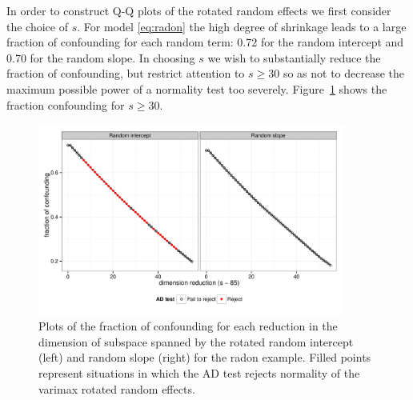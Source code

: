 \documentclass[12pt]{article} %
\newcommand{\hh}[1]{{\color{orange} #1}}
\begin{document}
In order to construct Q-Q plots of the rotated random effects we first consider the choice of $s$. For model \eqref{eq:radon} the high degree of shrinkage leads to a large fraction of confounding for each random term: 0.72 for the random intercept and 0.70 for the random slope. In choosing $s$ we wish to substantially reduce the fraction of confounding, but restrict attention to $s \geq 30$ so as not to decrease the maximum possible power of a normality test too severely. Figure~\ref{fig:radon-dim} shows the fraction confounding for $s \geq 30$. 
%

\begin{figure}
\centering
	\includegraphics[width=0.9\textwidth]{radon_elbows.pdf}
	\caption{\label{fig:radon-dim} Plots of the fraction of confounding for each reduction in the dimension of subspace spanned by the rotated random intercept (left) and random slope (right) for the radon example. Filled points represent situations in which the AD test rejects normality of the varimax rotated random effects.}
\end{figure}
\end{document}
